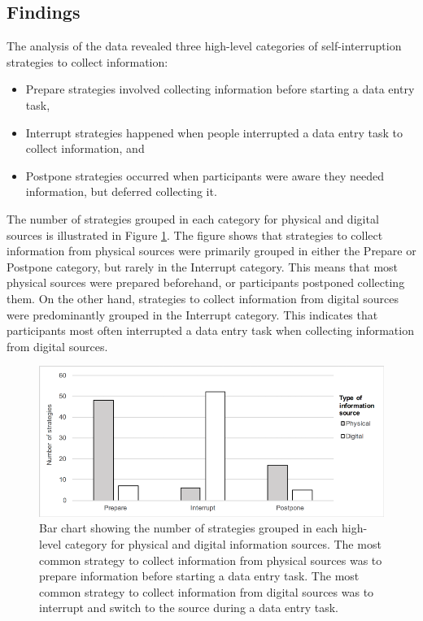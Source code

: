 \subsection{Findings}
The analysis of the data revealed three high-level categories of self-interruption strategies to collect information: 

\begin{itemize}
\item
Prepare strategies involved collecting information before starting a data entry task, 
\item
Interrupt strategies happened when people interrupted a data entry task to collect information, and 
\item
Postpone strategies occurred when participants were aware they needed information, but deferred collecting it. 
\end{itemize}

The number of strategies grouped in each category for physical and digital sources is illustrated in Figure \ref{fig:ch12_graph}. The figure shows that strategies to collect information from physical sources were primarily grouped in either the Prepare or Postpone category, but rarely in the Interrupt category. This means that most physical sources were prepared beforehand, or participants postponed collecting them. On the other hand, strategies to collect information from digital sources were predominantly grouped in the Interrupt category. This indicates that participants most often interrupted a data entry task when collecting information from digital sources. 

\begin{figure}
\centering
\includegraphics[scale=0.8]{images/ch12/ch12_graph.pdf}
\caption[Study 2 bar chart of interruption strategies]{Bar chart showing the number of strategies grouped in each high-level category for physical and digital information sources. The most common strategy to collect information from physical sources was to prepare information before starting a data entry task. The most common strategy to collect information from digital sources was to interrupt and switch to the source during a data entry task.}
\label{fig:ch12_graph}
\end{figure}

